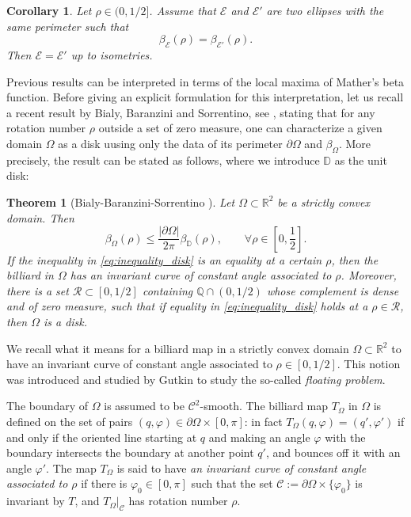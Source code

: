 \documentclass[a4paper]{article}
\newtheorem{theorem}{Theorem}
\newtheorem{corollary}{Corollary}
\theoremstyle{definition}
\def\D{\mathbb{D}}
\def\R{\mathbb{R}}
\def\Q{\mathbb{Q}}
\begin{document}
\begin{corollary}
\label{cor:main_cst_perimeter}
    Let $\rho\in(0,1/2]$. Assume that $\mathscr E$ and $\mathscr E'$ are two ellipses with the same perimeter such that
    \[
    \beta_{\mathscr E}(\rho) = \beta_{\mathscr E'}(\rho).
    \]
    Then $\mathscr E=\mathscr E'$ up to isometries.
\end{corollary}
\vspace{0.2cm}

Previous results can be interpreted in terms of the local maxima of Mather's beta function. Before giving an explicit formulation for this interpretation, let us recall a recent result by Bialy, Baranzini and Sorrentino, see \cite[Theorem 4.1]{BBS}, stating that for any rotation number $\rho$ outside a set of zero measure, one can characterize a given domain $\Omega$ as a disk uusing only the data of its perimeter $\partial\Omega$ and $\beta_{\Omega}$. More precisely, the result can be stated as follows, where we introduce $\D$ as the unit disk:

\begin{theorem}[Bialy-Baranzini-Sorrentino \cite{BBS}]
\label{thm:bbs}
Let $\Omega\subset\R^2$ be a strictly convex domain. Then
\begin{equation}
    \label{eq:inequality_disk}
    \beta_{\Omega}(\rho) \leq \frac{|\partial\Omega|}{2\pi}\beta_{\D}(\rho),\qquad \forall\rho\in\left[0,\frac{1}{2}\right].
\end{equation}
If the inequality in \eqref{eq:inequality_disk} is an equality at a certain $\rho$, then the billiard in $\Omega$ has an invariant curve of constant angle associated to $\rho$. Moreover, there is a set $\mathscr R\subset[0,1/2]$ containing $\Q\cap(0,1/2)$ whose complement is dense and of zero measure, such that if equality in \eqref{eq:inequality_disk} holds at a $\rho\in\mathscr R$, then $\Omega$ is a disk.
\end{theorem}

We recall what it means for a billiard map in a strictly convex domain $\Omega\subset\R^2$ to have an invariant curve of constant angle associated to $\rho\in[0,1/2]$. This notion was introduced and studied by Gutkin \cite{Gutkin} to study the so-called \textit{floating problem}.

The boundary of $\Omega$ is assumed to be $\mathscr C^2$-smooth. The billiard map $T_{\Omega}$ in $\Omega$ is defined on the set of pairs $(q,\varphi)\in\partial\Omega\times [0,\pi]$: 
in fact $T_{\Omega}(q,\varphi)=(q',\varphi')$ if and only if the oriented line starting at $q$ and making an angle $\varphi$ with the boundary intersects the boundary at another point $q'$, 
and bounces off it with an angle $\varphi'$. 
The map $T_{\Omega}$ is said to have \textit{an invariant curve of constant angle associated to $\rho$} if there is $\varphi_0\in[0,\pi]$ such that the set $\mathscr C :=\partial\Omega\times\{\varphi_0\}$ is invariant by $T$, and $\left.T_{\Omega}\right|_{\mathscr C}$ has rotation number $\rho$.
\end{document}
